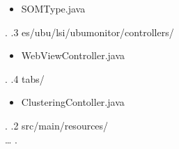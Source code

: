{\begin{minipage}[t]{10cm}
\begin{itemize}
                        \item SOMType{.}java
                    \end{itemize}
                \end{minipage}
                .
            .3 es/ubu/lsi/ubumonitor/controllers/ \\
                \begin{minipage}[t]{10cm}
                    \begin{itemize}
                        \item WebViewController{.}java
                    \end{itemize}
                \end{minipage}
            .
                .4 tabs/ \\
                \begin{minipage}[t]{10cm}
                    \begin{itemize}
                        \item ClusteringContoller{.}java
                    \end{itemize}
                \end{minipage}
                .
        .2 src/main/resources/ \\
        \dots
        .
}

\newpage


